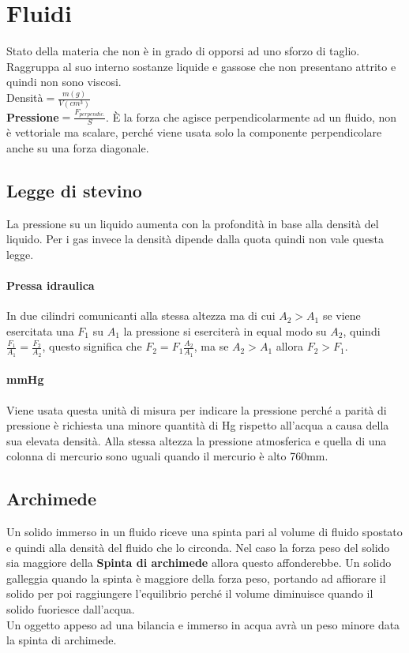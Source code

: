 \documentclass[10pt]{article}
\begin{document}
\section*{Fluidi}
Stato della materia che non è in grado di opporsi ad uno sforzo di taglio. Raggruppa al suo interno sostanze liquide e gassose che non presentano attrito e quindi non sono viscosi.\\
Densità$=\frac{m(g)}{V(cm^3)}$\\
\textbf{Pressione}$=\frac{F_{perpendic.}}{S}$. È la forza che agisce perpendicolarmente ad un fluido, non è vettoriale ma scalare, perché viene usata solo la componente perpendicolare anche su una forza diagonale. 
\subsection*{Legge di stevino}
La pressione su un liquido aumenta con la profondità in base alla densità del liquido. Per i gas invece la densità dipende dalla quota quindi non vale questa legge. 
\paragraph*{Pressa idraulica} In due cilindri comunicanti alla stessa altezza ma di cui $A_2>A_1$ se viene esercitata una $F_1$ su $A_1$ la pressione si eserciterà in equal modo su $A_2$, quindi $\frac{F_1}{A_1}=\frac{F_2}{A_2}$, questo significa che $F_2=F_1\frac{A_2}{A_1}$, ma se $A_2>A_1$ allora $F_2>F_1$.
\paragraph*{mmHg} Viene usata questa unità di misura per indicare la pressione perché a parità di pressione è richiesta una minore quantità di Hg rispetto all'acqua a causa della sua elevata densità. Alla stessa altezza la pressione atmosferica e quella di una colonna di mercurio sono uguali quando il mercurio è alto 760mm. 
\subsection*{Archimede} Un solido immerso in un fluido riceve una spinta pari al volume di fluido spostato e quindi alla densità del fluido che lo circonda. Nel caso la forza peso del solido sia maggiore della \textbf{Spinta di archimede} allora questo affonderebbe. Un solido galleggia quando la spinta è maggiore della forza peso, portando ad affiorare il solido per poi raggiungere l'equilibrio perché il volume diminuisce quando il solido fuoriesce dall'acqua.\\
Un oggetto appeso ad una bilancia e immerso in acqua avrà un peso minore data la spinta di archimede. 
\end{document}
